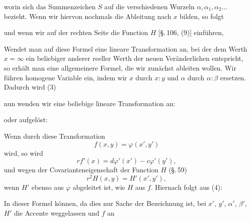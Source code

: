 

worin sich das Summenzeichen $S$ auf die verschiedenen Wurzeln
$\alpha, \alpha_1, \alpha_2 \dots$ bezieht. Wenn wir hiervon nochmals die
Ableitung nach $x$ bilden, so folgt


und wenn wir auf der rechten Seite die Function $H$ [\S.\,106, (9)]
einführen,


Wendet man auf diese Formel eine lineare Transformation an, bei der
dem Werth $x = \infty$ ein beliebiger anderer reeller Werth der neuen
Veränderlichen entspricht, so erhält man eine allgemeinere Formel,
die wir zunächst ableiten wollen. Wir führen homogene Variable ein,
indem wir $x$ durch $x:y$ und $\alpha$ durch $\alpha:\beta$ ersetzen.
Dadurch wird (3)


nun wenden wir eine beliebige lineare Transformation an:


oder aufgelöst:


Wenn durch diese Transformation
\[
f(x,y) = \varphi(x', y')
\]
wird, so wird
\[
rf'(x) = d\varphi'(x') - c\varphi'(y'),
\]
und wegen der Covarianteneigenschaft der Function $H$ (\S.\,59)
\[
r^2 H(x,y) = H'(x', y'),
\]
wenn $H'$ ebenso aus $\varphi$ abgeleitet ist, wie $H$ aus $f$. Hiernach
folgt aus (4):


In dieser Formel können, da dies nur Sache der Bezeichnung ist, bei
$x'$, $y'$, $\alpha'$, $\beta'$, $H'$ die Accente weggelassen und $f$ an
